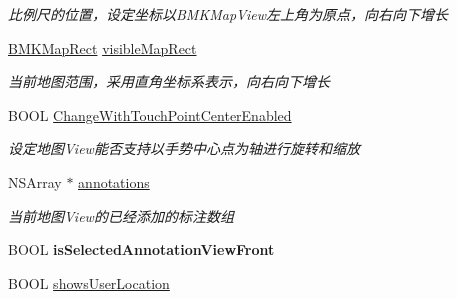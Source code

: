 \begin{DoxyCompactItemize}
\begin{DoxyCompactList}\small\item\em 比例尺的位置，设定坐标以\+B\+M\+K\+Map\+View左上角为原点，向右向下增长 \end{DoxyCompactList}\item 
\hypertarget{interface_b_m_k_map_view_a35576ab39592ef50d1190c2b672c0923}{}\hyperlink{struct_b_m_k_map_rect}{B\+M\+K\+Map\+Rect} \hyperlink{interface_b_m_k_map_view_a35576ab39592ef50d1190c2b672c0923}{visible\+Map\+Rect}\label{interface_b_m_k_map_view_a35576ab39592ef50d1190c2b672c0923}

\begin{DoxyCompactList}\small\item\em 当前地图范围，采用直角坐标系表示，向右向下增长 \end{DoxyCompactList}\item 
\hypertarget{interface_b_m_k_map_view_aa1868ea167edc68fe4b15ad982968ade}{}B\+O\+O\+L \hyperlink{interface_b_m_k_map_view_aa1868ea167edc68fe4b15ad982968ade}{Change\+With\+Touch\+Point\+Center\+Enabled}\label{interface_b_m_k_map_view_aa1868ea167edc68fe4b15ad982968ade}

\begin{DoxyCompactList}\small\item\em 设定地图\+View能否支持以手势中心点为轴进行旋转和缩放 \end{DoxyCompactList}\item 
\hypertarget{interface_b_m_k_map_view_a61bc5de820abcf06bf3792c933f3e618}{}N\+S\+Array $\ast$ \hyperlink{interface_b_m_k_map_view_a61bc5de820abcf06bf3792c933f3e618}{annotations}\label{interface_b_m_k_map_view_a61bc5de820abcf06bf3792c933f3e618}

\begin{DoxyCompactList}\small\item\em 当前地图\+View的已经添加的标注数组 \end{DoxyCompactList}\item 
\hypertarget{interface_b_m_k_map_view_a5907ada55d984353e2af6c510a334810}{}B\+O\+O\+L {\bfseries is\+Selected\+Annotation\+View\+Front}\label{interface_b_m_k_map_view_a5907ada55d984353e2af6c510a334810}

\item 
\hypertarget{interface_b_m_k_map_view_a6e18e9532c42e940eca7739378348af4}{}B\+O\+O\+L \hyperlink{interface_b_m_k_map_view_a6e18e9532c42e940eca7739378348af4}{shows\+User\+Location}\label{interface_b_m_k_map_view_a6e18e9532c42e940eca7739378348af4}


\end{DoxyCompactItemize}
